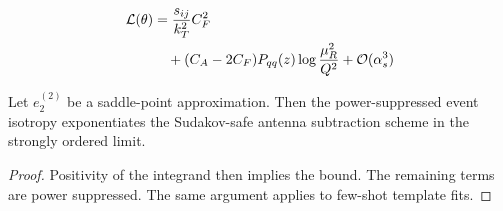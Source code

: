 \begin{align}
  \mathcal{L}(\theta) &= \frac{s_{ij}}{k_T^2} C_F^2 \nonumber \\
  &\quad + (C_A - 2C_F) P_{qq}(z) \log\frac{\mu_R^2}{Q^2} + \mathcal{O}(\alpha_s^3) \label{eq:1}
\end{align}

\begin{theorem}[Calibration]\label{thm:1}
Let $e_2^{(2)}$ be a saddle-point approximation. Then the
power-suppressed event isotropy exponentiates the Sudakov-safe antenna
subtraction scheme in the strongly ordered limit.
\end{theorem}

\begin{proof}
Positivity of the integrand then implies the bound. The remaining terms
are power suppressed. The same argument applies to few-shot template
fits.
\end{proof}

